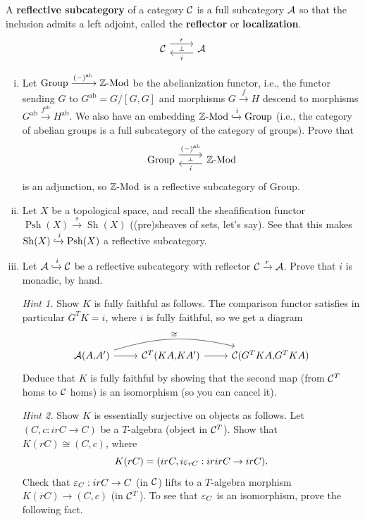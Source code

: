 \documentclass[12pt]{article}
\newcommand{\LMod}{\text{-}\mathrm{Mod}}
\newcommand{\Group}{\mathrm{Group}}
\newcommand{\ab}{\mathrm{ab}}
\DeclareMathOperator{\Psh}{Psh}
\DeclareMathOperator{\Sh}{Sh}
\begin{document}

\begin{problem}
    A \textbf{reflective subcategory} of a category $\mathcal{C}$ is a full subcategory $\mathcal{A}$ so that the inclusion admits a left adjoint, called the \textbf{reflector} or \textbf{localization}.
    \[\adjunction{\cC}{\cA}{r}{i}\]
    \begin{enumerate}[(i)]
        \item Let $\Group \xrightarrow{(-)^\ab} \Z\LMod$ be the abelianization functor, i.e., the functor sending $G$ to $G^\ab = G/[G,G]$ and morphisms $G\xrightarrow{f} H$ descend to morphisms $G^\ab \xrightarrow{f^\ab} H^\ab$. We also have an embedding $\Z\LMod \xhookrightarrow{i} \Group$ (i.e., the category of abelian groups is a full subcategory of the category of groups). Prove that
        \[\adjunction{\Group}{\Z\LMod}{(-)^\ab}{i}\]
        is an adjunction, so $\Z\LMod$ is a reflective subcategory of $\Group$.

        \bigskip
        
        \item Let $X$ be a topological space, and recall the sheafification functor $\Psh(X) \xrightarrow{s} \Sh(X)$ ((pre)sheaves of sets, let's say). See that this makes $\Sh(X) \xhookrightarrow{i} \Psh(X)$ a reflective subcategory.

        \bigskip

        \item Let $\mathcal{A} \xhookrightarrow{i} \mathcal{C}$ be a reflective subcategory with reflector $\mathcal{C} \xrightarrow{r} \mathcal{A}$. Prove that $i$ is monadic, by hand.

        \textit{Hint 1.} Show $K$ is fully faithful as follows. The comparison functor satisfies in particular $G^T K = i$, where $i$ is fully faithful, so we get a diagram
        \[\begin{tikzcd}
            \cA(A{,}A') \rar \ar[rr,bend left=15,"\cong"] & \cC^T(KA{,}KA') \rar & \cC(G^T K A{,} G^T K A)
        \end{tikzcd}\]
        Deduce that $K$ is fully faithful by showing that the second map (from $\mathcal{C}^T$ homs to $\mathcal{C}$ homs) is an isomorphism (so you can cancel it).

        \textit{Hint 2.} Show $K$ is essentially surjective on objects as follows. Let $(C,c:irC\to C)$ be a $T$-algebra (object in $\mathcal{C}^T$). Show that $K(rC) \cong (C,c)$, where
        \[K(rC) = (irC, i\varepsilon_{rC}: irirC \to irC).\]
        Check that $\varepsilon_C: irC \to C$ (in $\mathcal{C}$) lifts to a $T$-algebra morphism $K(rC) \to (C,c)$ (in $\mathcal{C}^T$). To see that $\varepsilon_C$ is an isomorphism, prove the following fact.
        

\end{enumerate}
\end{problem}
\end{document}
